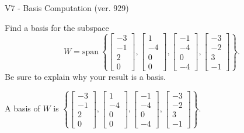 \begin{exercise}
  \begin{exerciseTitle}V7 - Basis Computation (ver. 929)\end{exerciseTitle}
  \begin{exerciseStatement}
    Find a basis for the subspace 
\[W=\mathrm{span}\ \left\{\left[\begin{array}{r}
-3 \\
-1 \\
2 \\
0
\end{array}\right] , \left[\begin{array}{r}
1 \\
-4 \\
0 \\
0
\end{array}\right] , \left[\begin{array}{r}
-1 \\
-4 \\
0 \\
-4
\end{array}\right] , \left[\begin{array}{r}
-3 \\
-2 \\
3 \\
-1
\end{array}\right]\right\}.\]
 Be sure to explain why your result is a basis.


  \end{exerciseStatement}
  \begin{exerciseAnswer}
   A basis of \(W\) is  \(\left\{\left[\begin{array}{r}
-3 \\
-1 \\
2 \\
0
\end{array}\right] , \left[\begin{array}{r}
1 \\
-4 \\
0 \\
0
\end{array}\right] , \left[\begin{array}{r}
-1 \\
-4 \\
0 \\
-4
\end{array}\right] , \left[\begin{array}{r}
-3 \\
-2 \\
3 \\
-1
\end{array}\right]\right\}\).
  


  \end{exerciseAnswer}
\end{exercise}